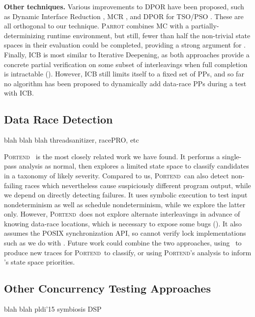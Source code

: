 {\bf Other techniques.} Various improvements to DPOR have been proposed, such as Dynamic Interface Reduction \cite{demeter}, MCR \cite{mcr}, and DPOR for TSO/PSO \cite{tsopso}.
These are all orthogonal to our technique.
\textsc{Parrot} \cite{parrot} combines MC with a partially-determinizing runtime environment, but still, fewer than half the non-trivial state spaces in their evaluation could be completed, providing a strong argument for \quicksand.
Finally, ICB \cite{chess} is most similar to Iterative Deepening, as both approaches provide a concrete partial verification on some subset of interleavings when full completion is intractable (\sect{\ref{sec:future}}).
However, ICB still limits itself to a fixed set of PPs, and so far no algorithm has been proposed to dynamically add data-race PPs during a test with ICB.

\subsection{Data Race Detection}

blah blah blah threadsanitizer, racePRO, etc

\newcommand\portend{\textsc{Portend}}
\portend~\cite{portend} is the most closely related work we have found.
It performs a single-pass analysis as normal, then explores a limited state space to classify candidates in a taxonomy of likely severity.
Compared to us, \portend~can also detect non-failing races which nevertheless cause suspiciously different program output,
while we depend on directly detecting failures.
It uses symbolic execution to test input nondeterminism as well as schedule nondeterminism,
while we explore the latter only.
However, \portend~does not explore alternate interleavings in advance of knowing data-race locations,
which is necessary to expose some bugs (\sect{\ref{sec:eval-falseneg}}).
It also assumes the POSIX synchronization API, so cannot verify lock implementations such as we do with \mxtest.
Future work could combine the two approaches, using \landslide~to produce new traces for \portend~to classify, or using \portend's analysis to inform \quicksand's state space priorities.

\subsection{Other Concurrency Testing Approaches} %

blah blah pldi'15 symbiosis DSP


